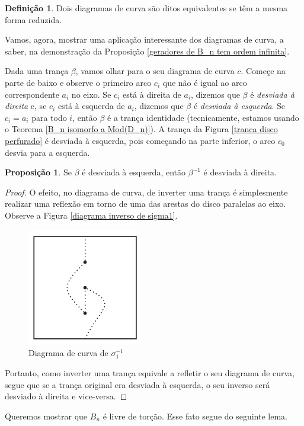 \documentclass[a4paper,portuguese,11pt,twoside, leqno]{book}
\theoremstyle{definition}
\newtheorem{deff}{Definição}[section]
\newtheorem{prop}{Proposição}[section]
\begin{document}
	\begin{deff}
		\label{def equivalencia diagramas}
		Dois diagramas de curva são ditos equivalentes se têm a mesma forma reduzida.
	\end{deff}  
	\par\vspace{0.3cm} Vamos, agora, mostrar uma aplicação interessante dos diagramas de curva, a saber, na demonstração da Proposição \eqref{geradores de B_n tem ordem infinita}.
	\par\vspace{0.3cm} Dada uma trança $\beta$, vamos olhar para o seu diagrama de curva $c$. Começe na parte de baixo e observe o primeiro arco $c_i$ que não é igual ao arco correspondente $a_i$ no eixo. Se $c_i$ está à direita de $a_i$, dizemos que $\beta$ é \textit{desviada à direita} e, se $c_i$ está à esquerda de $a_i$, dizemos que $\beta$ é \textit{desviada à esquerda}. Se $c_i = a_i$ para todo $i$, então $\beta$ é a trança identidade (tecnicamente, estamos usando o Teorema \eqref{B_n isomorfo a Mod(D_n)}). A trança da Figura \eqref{tranca disco perfurado} é desviada à esquerda, pois começando na parte inferior, o arco $c_0$ desvia para a esquerda.
	\begin{prop}
		\label{desvio a direita desvio a esquerda}
		Se $\beta$ é desviada à esquerda, então $\beta^{-1}$ é desviada à direita.
	\end{prop}
	\begin{proof}
		O efeito, no diagrama de curva, de inverter uma trança é simplesmente realizar uma reflexão em torno de uma das arestas do disco paralelas ao eixo. Observe a Figura \eqref{diagrama inverso de sigma1}.
		\begin{figure}[H]
			\begin{center}
				\includegraphics[width=5cm]{inverso.png}
			\end{center}\caption{Diagrama de curva de $\sigma_1^{-1}$}\label{diagrama inverso de sigma1}
		\end{figure}
		\par\vspace{0.3cm} Portanto, como inverter uma trança equivale a refletir o seu diagrama de curva, segue que se a trança original era desviada à esquerda, o seu inverso será desviado à direita e vice-versa.
	\end{proof}
	\par\vspace{0.3cm} Queremos mostrar que $B_n$ é livre de torção. Esse fato segue do seguinte lema.
	
\end{document}
